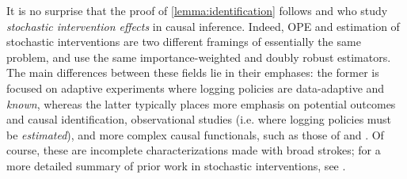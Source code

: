 \begin{remark}\label{remark:equivalence-OPE-stochastic-interventions}
  It is no surprise that the proof of \cref{lemma:identification} follows \citet{robins1986new} and \citet{kennedy2019nonparametric} who study \emph{stochastic intervention effects} in causal inference. Indeed, OPE and estimation of stochastic interventions are two different framings of essentially the same problem, and use the same importance-weighted and doubly robust estimators. The main differences between these fields lie in their emphases: the former is focused on adaptive experiments where logging policies are data-adaptive and \emph{known}, whereas the latter typically places more emphasis on potential outcomes and causal identification, observational studies (i.e. where logging policies must be \emph{estimated}), and more complex causal functionals, such as those of \citet{haneuse2013estimation} and \citet{kennedy2019nonparametric}. Of course, these are incomplete characterizations made with broad strokes; for a more detailed summary of prior work in stochastic interventions, see \citet[Section 1]{kennedy2019nonparametric}. 
\end{remark}

